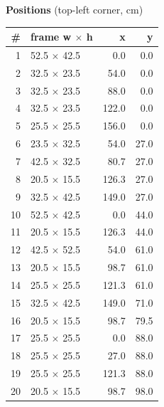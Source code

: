 \documentclass[a4paper,landscape,10pt]{article}
\begin{document}
\begin{minipage}[t]{0.25\textwidth}
\vspace{8pt}
{\bfseries Positions} (top-left corner, cm)\\[2pt]
\tiny
\begin{tabular}{@{}r l r r@{}}
\toprule
\# & frame w $\times$ h & x & y \\
\midrule
1 & 52.5 $\times$ 42.5 & 0.0 & 0.0 \\
2 & 32.5 $\times$ 23.5 & 54.0 & 0.0 \\
3 & 32.5 $\times$ 23.5 & 88.0 & 0.0 \\
4 & 32.5 $\times$ 23.5 & 122.0 & 0.0 \\
5 & 25.5 $\times$ 25.5 & 156.0 & 0.0 \\
6 & 23.5 $\times$ 32.5 & 54.0 & 27.0 \\
7 & 42.5 $\times$ 32.5 & 80.7 & 27.0 \\
8 & 20.5 $\times$ 15.5 & 126.3 & 27.0 \\
9 & 32.5 $\times$ 42.5 & 149.0 & 27.0 \\
10 & 52.5 $\times$ 42.5 & 0.0 & 44.0 \\
11 & 20.5 $\times$ 15.5 & 126.3 & 44.0 \\
12 & 42.5 $\times$ 52.5 & 54.0 & 61.0 \\
13 & 20.5 $\times$ 15.5 & 98.7 & 61.0 \\
14 & 25.5 $\times$ 25.5 & 121.3 & 61.0 \\
15 & 32.5 $\times$ 42.5 & 149.0 & 71.0 \\
16 & 20.5 $\times$ 15.5 & 98.7 & 79.5 \\
17 & 25.5 $\times$ 25.5 & 0.0 & 88.0 \\
18 & 25.5 $\times$ 25.5 & 27.0 & 88.0 \\
19 & 25.5 $\times$ 25.5 & 121.3 & 88.0 \\
20 & 20.5 $\times$ 15.5 & 98.7 & 98.0 \\
\bottomrule
\end{tabular}
\end{minipage}
\clearpage
\end{document}
